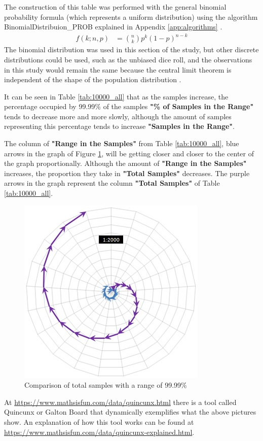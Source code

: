 The construction of this table was performed with the general binomial probability formula (which represents a uniform distribution) using the algorithm \tiny BinomialDistribuion\_PROB \normalsize explained in Appendix \ref{app:algorithms} \cite{mathisfun_binomial_distribution}.
	\begin{align*}
	f(k;n,p) &= \binom{n}{k} p^k(1 - p)^{n-k}
	\end{align*}
The binomial distribution was used in this section of the study, but other discrete distributions could be used, such as the unbiased dice roll, and the observations in this study would remain the same because the central limit theorem is independent of the shape of the population distribution \cite{statisticsbyjim_central_limit_theorem_explainded}.

It can be seen in Table \ref{tab:10000_all} that as the samples increase, the percentage occupied by 99.99\% of the samples \textbf{"\% of Samples in the Range"} tends to decrease more and more slowly, although the amount of samples representing this percentage tends to increase \textbf{"Samples in the Range"}.

The column of \textbf{"Range in the Samples"} from Table \ref{tab:10000_all}, blue arrows in the graph of Figure \ref{fig:total_comparison_chart_with_99_range}, will be getting closer and closer to the center of the graph proportionally. Although the amount of \textbf{"Range in the Samples"} increases, the proportion they take in \textbf{"Total Samples"} decreases. The purple arrows in the graph represent the column \textbf{"Total Samples"} of Table \ref{tab:10000_all}. 
	\begin{figure}[H]
	\caption{Comparison of total samples with a range of 99.99\% }
	\label{fig:total_comparison_chart_with_99_range}
	\centering
	\includegraphics[scale=.9]{sections/images/total_comparison_chart_with_99_range.jpg}
	\end{figure}

At \url{https://www.mathsisfun.com/data/quincunx.html} there is a tool called Quincunx or Galton Board that dynamically exemplifies what the above pictures show. An explanation of how this tool works can be found at \url{https://www.mathsisfun.com/data/quincunx-explained.html}. 